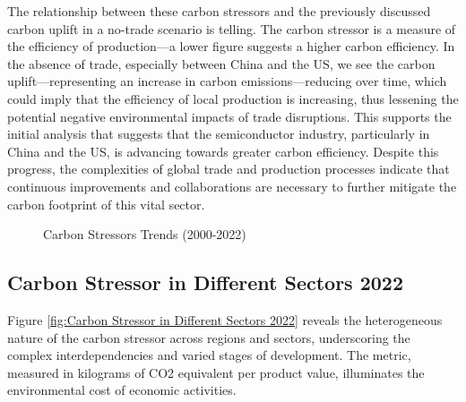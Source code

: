 The relationship between these carbon stressors and the previously discussed carbon uplift in a no-trade scenario is telling. The carbon stressor is a measure of the efficiency of production—a lower figure suggests a higher carbon efficiency. In the absence of trade, especially between China and the US, we see the carbon uplift—representing an increase in carbon emissions—reducing over time, which could imply that the efficiency of local production is increasing, thus lessening the potential negative environmental impacts of trade disruptions. This supports the initial analysis that suggests that the semiconductor industry, particularly in China and the US, is advancing towards greater carbon efficiency. Despite this progress, the complexities of global trade and production processes indicate that continuous improvements and collaborations are necessary to further mitigate the carbon footprint of this vital sector.
\ifincludefigures
\begin{figure}
 \centering
 \caption{Carbon Stressors Trends (2000-2022)}\label{fig:Carbon Stressor Trends (2000-2022)}
\end{figure}
\fi
\subsection{Carbon Stressor in Different Sectors 2022}
Figure \ref{fig:Carbon Stressor in Different Sectors 2022} reveals the heterogeneous nature of the carbon stressor across regions and sectors, underscoring the complex interdependencies and varied stages of development. The metric, measured in kilograms of CO2 equivalent per product value, illuminates the environmental cost of economic activities. 

